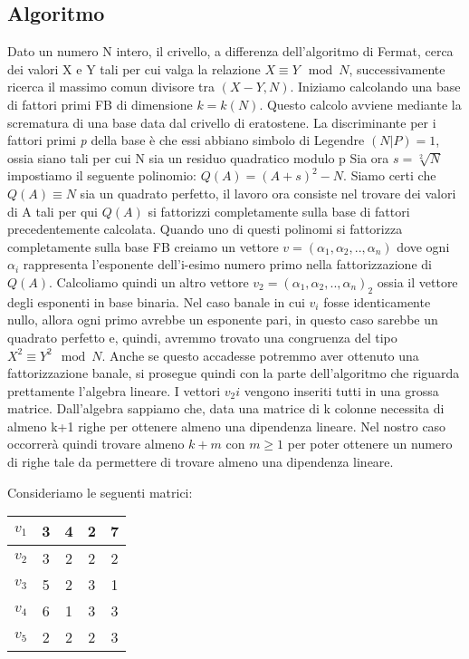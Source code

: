 \begin{flushleft}
\subsection*{Algoritmo}
Dato un numero N intero, il crivello, a differenza dell'algoritmo di Fermat, cerca dei valori 
X e Y tali per cui valga la relazione $X \equiv Y \mod N$, successivamente ricerca il massimo comun
divisore tra $(X-Y,N)$.
Iniziamo calcolando una base di fattori primi FB di dimensione $k=k(N)$.
Questo calcolo avviene mediante la scrematura di una base data dal crivello di eratostene.
La discriminante per i fattori primi \emph{p} della base è che essi abbiano simbolo di Legendre 
$(N|P)=1$, ossia siano tali per cui N sia un residuo quadratico modulo p
Sia ora $s=\sqrt[2]{N}$ impostiamo il seguente polinomio: $Q(A)=(A+s)^2-N$.
Siamo certi che $Q(A)\equiv N$ sia un quadrato perfetto, il lavoro ora consiste nel 
trovare dei valori di A tali per qui $Q(A)$ si fattorizzi completamente sulla base di fattori
precedentemente calcolata.
Quando uno di questi polinomi si fattorizza completamente sulla base FB creiamo un vettore
$v=(\alpha_1,\alpha_2, .. , \alpha_n)$ dove ogni $\alpha_i$ rappresenta l'esponente dell'i-esimo numero primo nella fattorizzazione di $Q(A)$.
Calcoliamo quindi un altro vettore $v_2=(\alpha_1,\alpha_2, .. , \alpha_n)_2$ ossia il vettore 
degli esponenti in base binaria.
Nel caso banale in cui $v_i$ fosse identicamente nullo, allora ogni primo avrebbe un esponente
pari, in questo caso sarebbe un quadrato perfetto e, quindi, avremmo trovato una congruenza del tipo $X^2 \equiv Y^2\mod N$.
Anche se questo accadesse potremmo aver ottenuto una fattorizzazione banale, si prosegue quindi
con la parte dell'algoritmo che riguarda prettamente l'algebra lineare.
I vettori $v_2i$ vengono inseriti tutti in una grossa matrice.
Dall'algebra sappiamo che, data una matrice di k colonne necessita di almeno k+1 righe per 
ottenere almeno una dipendenza lineare.
Nel nostro caso occorrerà quindi trovare almeno $k+m$ con $m\geq1$ per poter ottenere un numero di righe tale da permettere di trovare almeno una dipendenza lineare.

Consideriamo le seguenti matrici:

\begin{center}

\begin{tabular}{ |l|c|c|c|c| }
\hline
$v_1$ & 3 & 4 & 2 & 7\\
\hline
$v_2$ & 3 & 2 & 2 & 2\\
\hline
$v_3$ & 5 & 2 & 3 & 1\\
\hline
$v_4$ & 6 & 1 & 3 & 3\\
\hline
$v_5$ & 2 & 2 & 2 & 3\\
\hline
\end{tabular}


\end{center}
\end{flushleft}
